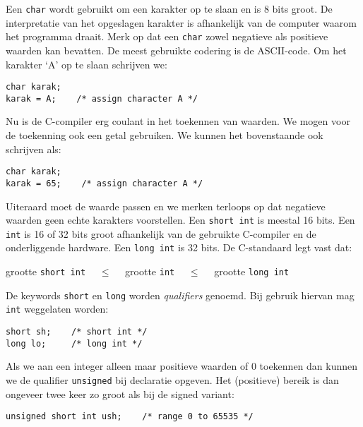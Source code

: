 Een \texttt{char} wordt gebruikt om een karakter op te slaan en is 8 bits groot. De interpretatie van het opgeslagen karakter is afhankelijk van de computer waarom het programma draait. Merk op dat een \texttt{char} zowel negatieve als positieve waarden kan bevatten. De meest gebruikte codering is de ASCII-code. Om het karakter `A' op te slaan schrijven we:

\hspace*{1em}\texttt{char karak;}\\
\hspace*{1em}\texttt{karak = \textquotesingle A\textquotesingle; \ \ \ /* assign character A */}

Nu is de C-compiler erg coulant in het toekennen van waarden. We mogen voor de toekenning ook een getal gebruiken. We kunnen het bovenstaande ook schrijven als:

\hspace*{1em}\texttt{char karak;}\\
\hspace*{1em}\texttt{karak = 65; \ \ \ /* assign character A */}

Uiteraard moet de waarde passen en we merken terloops op dat negatieve waarden geen echte karakters voorstellen. Een \texttt{short int} is meestal 16 bits. Een \texttt{int} is 16 of 32 bits groot afhankelijk van de gebruikte C-compiler en de onderliggende hardware. Een \texttt{long int} is 32 bits. De C-standaard legt vast dat:

\hspace*{1em}grootte \texttt{short int} $\quad\leq\quad$ grootte \texttt{int} $\quad\leq\quad$ grootte \texttt{long int}

De keywords \texttt{short} en \texttt{long} worden \textsl{qualifiers} genoemd. Bij gebruik hiervan mag \texttt{int} weggelaten worden:

\hspace*{1em}\texttt{short sh; \ \ \ /* short int */}\\
\hspace*{1em}\texttt{long lo; \ \ \ \ /* long int */}

Als we aan een integer alleen maar positieve waarden of 0 toekennen dan kunnen we de qualifier \texttt{unsigned} bij declaratie opgeven. Het (positieve) bereik is dan ongeveer twee keer zo groot als bij de signed variant:

\hspace*{1em}\texttt{unsigned short int ush; \ \ \ /* range 0 to 65535 */}

